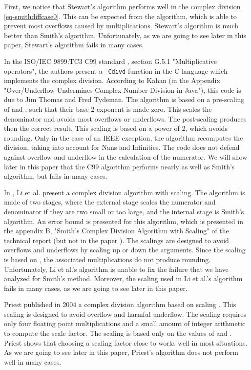 \documentclass{paper}
\begin{document}
First, we notice that Stewart's algorithm performs well in the 
complex division \ref{eq-smithdiffcase0}. 
This can be expected from the algorithm, which is able to prevent 
most overflows caused by multiplications. 
Stewart's algorithm is much better than Smith's algorithm. 
Unfortunately, as we are going to see later in this paper, 
Stewart's algorithm fails in many cases.

In the ISO/IEC 9899:TC3 C99 standard \cite{ProgrammingC}, 
section G.5.1 "Multiplicative operators", the authors present a \verb|_Cdivd| function 
in the C language which implements the complex division. 
According to Kahan \cite{KahanMarketing2000} (in the Appendix "Over/Underflow Undermines 
Complex Number Division in Java"), this code is due to Jim Thomas and Fred Tydeman. 
The algorithm is based on a pre-scaling of  and , such that their 
base 2 exponent is made zero. 
This scales the denominator  and avoids most overflows or underflows. 
The post-scaling produces then the correct result. 
This scaling is based on a power of 2, which avoids rounding. 
Only in the case of an IEEE exception, the algorithm recomputes the division, 
taking into account for Nans and Infinities. 
The code does not defend against overflow and underflow in the calculation of the numerator.
We will show later in this paper that the C99 algorithm performs 
nearly as well as Smith's algorithm, but fails in many cases.

In \cite{567808}, Li et al. present a complex division algorithm with scaling. 
The algorithm is made of two stages, where the external stage 
scales the numerator and denominator if they are two small 
or too large, and the internal stage is Smith's algorithm. 
An error bound is presented for this algorithm, which is presented 
in the appendix B, "Smith's Complex Division Algorithm with Scaling" of the 
technical report \cite{Li2000} (but not in the paper \cite{567808}).
The scalings are designed to avoid overflows and underflows by scaling 
up or down the arguments. 
Since the scaling is based on , the associated 
multiplications do not produce rounding. 
Unfortunately, Li et al.'s algorithm is unable to fix the failure that 
we have analyzed for Smith's method. 
Moreover, the scaling used in Li et al.'s algorithm  
fails in many cases, as we are going to see later in 
this paper. 

Priest published in 2004 a complex 
division algorithm based on scaling \cite{1039814}. 
This scaling is designed to avoid overflow and harmful underflow. 
The scaling requires only four floating point multiplications and 
a small amount of integer arithmetic to compute the scale 
factor. 
The scaling is based only on the values of  and . 
Priest shows that choosing a scaling factor close to  works 
well in most situations. 
As we are going to see later in this paper, Priest's algorithm 
does not perform well in many cases. 
\end{document}
